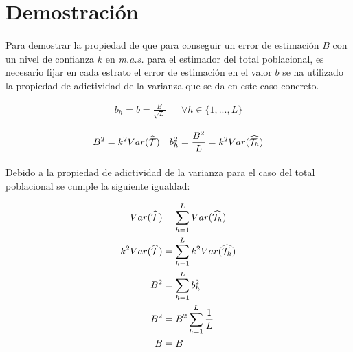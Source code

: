 \documentclass{article}
\begin{document}
  \section{Demostración}

    \paragraph{}
    Para demostrar la propiedad de que para conseguir un error de estimación $B$ con un nivel de confianza $k$ en \emph{m.a.s.} para el estimador del total poblacional, es necesario fijar en cada estrato el error de estimación en el valor $b$ se ha utilizado la propiedad de adictividad de la varianza que se da en este caso concreto.

    \begin{align}
      b_h = b = \frac{B}{\sqrt{L}} && \forall h \in \{1,...,L\}
    \end{align}

    \begin{align}
      B^2 = k^2Var(\widehat{\mathcal{T}}) && b_h^2 = \frac{B^2}{L} = k^2Var(\widehat{\mathcal{T}_h})
    \end{align}

    \paragraph{}
    Debido a la propiedad de adictividad de la varianza para el caso del total poblacional se cumple la siguiente igualdad:

    \begin{align}
      Var(\widehat{\mathcal{T}}) &= \sum\limits_{h=1}^L Var(\widehat{\mathcal{T}_h})\\
      k^2Var(\widehat{\mathcal{T}}) &= \sum\limits_{h=1}^L k^2Var(\widehat{\mathcal{T}_h})\\
      B^2 &= \sum\limits_{h=1}^L b_h^2 \\
      B^2 &= B^2\sum\limits_{h=1}^L \frac{1}{L} \\
      B &= B \\
    \end{align}

  \nocite{muest2017}
  \nocite{sarndal2003model}

  
  
\end{document}
